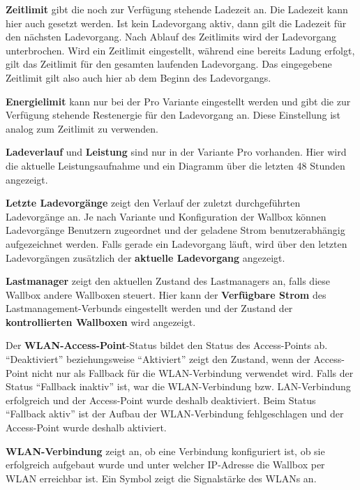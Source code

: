 \documentclass[a4paper,10pt]{article}
\begin{document}
\begin{multicols*}{2}
    \textbf{Zeitlimit} gibt die noch zur Verfügung stehende Ladezeit an.
	Die Ladezeit kann hier auch gesetzt werden. Ist kein Ladevorgang
	aktiv, dann gilt die Ladezeit für den nächsten Ladevorgang. Nach Ablauf des
	Zeitlimits wird der Ladevorgang unterbrochen. Wird ein Zeitlimit
	eingestellt, während eine bereits Ladung erfolgt, gilt das Zeitlimit für den
	gesamten laufenden Ladevorgang. Das eingegebene Zeitlimit gilt also auch
	hier ab dem Beginn des Ladevorgangs.

    \textbf{Energielimit} kann nur bei der Pro Variante eingestellt werden und 
	gibt die zur Verfügung stehende Restenergie für den
    Ladevorgang an. Diese Einstellung ist analog zum Zeitlimit zu verwenden.

    \textbf{Ladeverlauf} und \textbf{Leistung} sind nur in der Variante Pro
    vorhanden. Hier wird die aktuelle Leistungsaufnahme und ein Diagramm über
    die letzten 48 Stunden angezeigt.

    \textbf{Letzte Ladevorgänge} zeigt den Verlauf der zuletzt durchgeführten
	Ladevorgänge an. Je nach Variante und Konfiguration der Wallbox können Ladevorgänge Benutzern
	zugeordnet und der geladene Strom benutzerabhängig aufgezeichnet werden. Falls gerade ein Ladevorgang läuft, 
	wird über den letzten Ladevorgängen zusätzlich der \textbf{aktuelle Ladevorgang} angezeigt.

    \textbf{Lastmanager} zeigt den aktuellen Zustand des Lastmanagers an, falls diese Wallbox
    andere Wallboxen steuert. Hier kann der \textbf{Verfügbare Strom} des Lastmanagement-Verbunds
    eingestellt werden und der Zustand der \textbf{kontrollierten Wallboxen} wird angezeigt.


    Der \textbf{WLAN-Access-Point}-Status bildet den Status des Access-Points ab.
    \enquote{Deaktiviert} beziehungsweise \enquote{Aktiviert} zeigt den Zustand, wenn der Access-Point nicht
    nur als Fallback für die WLAN-Verbindung verwendet wird. Falls der Status \enquote{Fallback inaktiv} ist,
    war die WLAN-Verbindung bzw. LAN-Verbindung erfolgreich und der Access-Point wurde deshalb deaktiviert.
    Beim Status \enquote{Fallback aktiv} ist der Aufbau der WLAN-Verbindung fehlgeschlagen und der
    Access-Point wurde deshalb aktiviert.

    \textbf{WLAN-Verbindung} zeigt an, ob eine Verbindung konfiguriert ist, ob sie erfolgreich aufgebaut wurde und
    unter welcher IP-Adresse die Wallbox per WLAN erreichbar ist. Ein Symbol
    zeigt die Signalstärke des WLANs an.


\end{multicols*}
\end{document}
